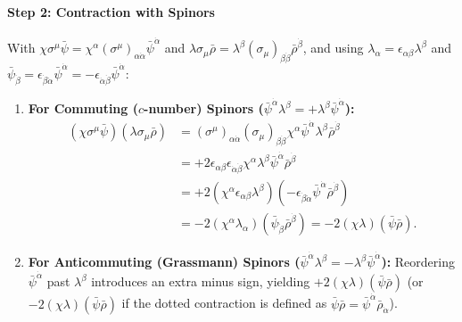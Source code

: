 \documentclass[11pt,a4paper]{article}
\begin{document}
\paragraph{Step 2: Contraction with Spinors}
With $\chi\sigma^\mu\bar{\psi} = \chi^\alpha (\sigma^\mu)_{\alpha\dot{\alpha}}\bar{\psi}^{\dot{\alpha}}$ and $\lambda\sigma_\mu\bar{\rho} = \lambda^\beta (\sigma_\mu)_{\beta\dot{\beta}}\bar{\rho}^{\dot{\beta}}$, and using $\lambda_\alpha = \epsilon_{\alpha\beta}\lambda^\beta$ and $\bar{\psi}_{\dot{\beta}} = \epsilon_{\dot{\beta}\dot{\alpha}}\bar{\psi}^{\dot{\alpha}} = -\epsilon_{\dot{\alpha}\dot{\beta}}\bar{\psi}^{\dot{\alpha}}$:
\begin{enumerate}
    \item \textbf{For Commuting ($c$-number) Spinors ($\bar{\psi}^{\dot{\alpha}}\lambda^\beta = +\lambda^\beta \bar{\psi}^{\dot{\alpha}}$):}
    \begin{align}
        (\chi \sigma^\mu \bar{\psi})(\lambda \sigma_\mu \bar{\rho}) &= (\sigma^\mu)_{\alpha\dot{\alpha}}(\sigma_\mu)_{\beta\dot{\beta}} \chi^\alpha \bar{\psi}^{\dot{\alpha}} \lambda^\beta \bar{\rho}^{\dot{\beta}} \nonumber \\
        &= +2\epsilon_{\alpha\beta}\epsilon_{\dot{\alpha}\dot{\beta}} \chi^\alpha \lambda^\beta \bar{\psi}^{\dot{\alpha}} \bar{\rho}^{\dot{\beta}} \nonumber \\
        &= +2\left(\chi^\alpha \epsilon_{\alpha\beta}\lambda^\beta\right)\left(-\epsilon_{\dot{\beta}\dot{\alpha}}\bar{\psi}^{\dot{\alpha}}\bar{\rho}^{\dot{\beta}}\right) \nonumber \\
        &= -2\left(\chi^\alpha \lambda_\alpha\right)\left(\bar{\psi}_{\dot{\beta}}\bar{\rho}^{\dot{\beta}}\right) = -2(\chi\lambda)(\bar{\psi}\bar{\rho}).
    \end{align}
    \item \textbf{For Anticommuting (Grassmann) Spinors ($\bar{\psi}^{\dot{\alpha}}\lambda^\beta = -\lambda^\beta \bar{\psi}^{\dot{\alpha}}$):}
    Reordering $\bar{\psi}^{\dot{\alpha}}$ past $\lambda^\beta$ introduces an extra minus sign, yielding $+2(\chi\lambda)(\bar{\psi}\bar{\rho})$ (or $-2(\chi\lambda)(\bar{\psi}\bar{\rho})$ if the dotted contraction is defined as $\bar{\psi}\bar{\rho} = \bar{\psi}^{\dot{\alpha}}\bar{\rho}_{\dot{\alpha}}$).
\end{enumerate}
\end{document}
